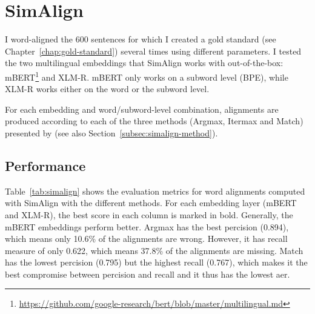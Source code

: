 \section{SimAlign}
I word-aligned the 600 sentences for which I created a gold standard (see Chapter~\ref{chap:gold-standard}) several times using different parameters. 
I tested the two multilingual embeddings that SimAlign works with out-of-the-box: mBERT\footnote{\url{https://github.com/google-research/bert/blob/master/multilingual.md}} and XLM-R\autocite{conneau-etal-2020-xlm}. 
mBERT only works on a subword level (BPE), while XLM-R works either on the word or the subword level. 

For each embedding and word/subword-level combination, alignments are produced according to each of the three methods (Argmax, Itermax and Match) presented by \cite{jalili-sabet-etal-2020-simalign} (see also Section~\ref{subsec:simalign-method}).

\subsection{Performance}
Table~\ref{tab:simalign} shows the evaluation metrics for word alignments computed with SimAlign with the different methods. 
For each embedding layer (mBERT and XLM-R), the best score in each column is marked in bold. 
Generally, the mBERT embeddings perform better. 
Argmax has the best percision (0.894), which means only 10.6\% of the alignments are wrong. 
However, it has \gls{recall} measure of only 0.622, which means 37.8\% of the alignments are missing.
Match has the lowest percision (0.795) but the highest recall (0.767), which makes it the best compromise between percision and recall and it thus has the lowest \acrshort{aer}.

